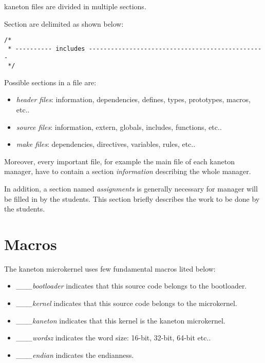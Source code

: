 kaneton files are divided in multiple sections.

Section are delimited as shown below:

\begin{verbatim}
/*
 * ---------- includes ------------------------------------------------
 */
\end{verbatim}

Possible sections in a file are:

\begin{itemize}
  \item
    \textit{header files}: information, dependencies, defines, types,
    prototypes, macros, etc..
  \item
    \textit{source files}: information, extern, globals, includes,
    functions, etc..
  \item
    \textit{make files}: dependencies, directives, variables, rules, etc..
\end{itemize}

Moreover, every important file, for example the main file of each
kaneton manager, have to contain a section \textit{information} describing
the whole manager.

In addition, a section named \textit{assignments} is generally necessary
for manager will be filled in by the students. This section briefly describes
the work to be done by the students.

%
%

\section{Macros}

The kaneton microkernel uses few fundamental macros lited below:

\begin{itemize}
  \item
    \textit{\_\_\_bootloader} indicates that this source code belongs to
    the bootloader.
  \item
    \textit{\_\_\_kernel} indicates that this source code belongs to the
    microkernel.
  \item
    \textit{\_\_\_kaneton} indicates that this kernel is the kaneton
    microkernel.
  \item
    \textit{\_\_\_wordsz} indicates the word size: 16-bit, 32-bit,
    64-bit etc..
  \item
    \textit{\_\_\_endian} indicates the endianness.
\end{itemize}
